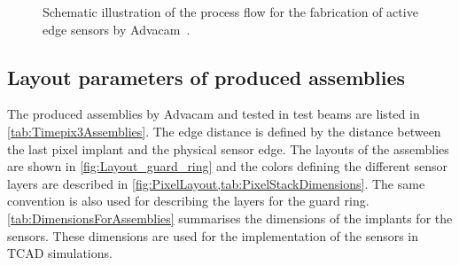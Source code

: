 \begin{figure}[htbp]
\begin{subfigure}[b]{0.3\textwidth}
    \caption{}
  \end{subfigure}

  \caption{Schematic illustration of the process flow for the
    fabrication of active edge sensors by
    Advacam~\cite{AdvacamRef}.}
  \label{fig:AdvacamProcessFlow}
\end{figure}


\newpage
\subsection{Layout parameters of produced assemblies}
\label{sec:AEgeometry}

The produced assemblies by Advacam and tested in test beams are listed
in \cref{tab:Timepix3Assemblies}. The edge distance is defined by the
distance between the last pixel implant and the physical sensor
edge. The layouts of the assemblies are shown in
\cref{fig:Layout_guard_ring} and the colors defining the different
sensor layers are described in
\cref{fig:PixelLayout,tab:PixelStackDimensions}. The same convention
is also used for describing the layers for the guard
ring. \cref{tab:DimensionsForAssemblies} summarises the dimensions of
the implants for the sensors. These dimensions are used for the
implementation of the sensors in TCAD simulations.



